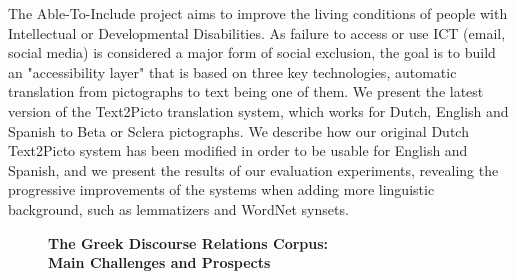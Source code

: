 \documentclass[10pt, a4paper, twopage, headinclude, footinclude, BCOR5mm]{book}
\begin{document}
\begin{table}[t!]
\end{table} 
\noindent
The Able-To-Include project aims to improve the living conditions of people with Intellectual or Developmental Disabilities. As failure to access or use ICT (email, social media) is considered a major form of social exclusion, the goal is to build an "accessibility layer" that is based on three key technologies, automatic translation from pictographs to text being one of them.   We present the latest version of the Text2Picto translation system, which works for Dutch, English and Spanish to Beta or Sclera pictographs. We describe how our original Dutch Text2Picto system has been modified in order to be usable for English and Spanish, and we present the results of our evaluation experiments, revealing the progressive improvements of the systems when adding more linguistic background, such as lemmatizers and WordNet synsets.  

\newpage

\begin{figure}[t!]
\centering
\large\textbf{The Greek Discourse Relations Corpus: \\ Main Challenges and Prospects}
\vspace*{0.5cm}
\end{figure}
\end{document}
